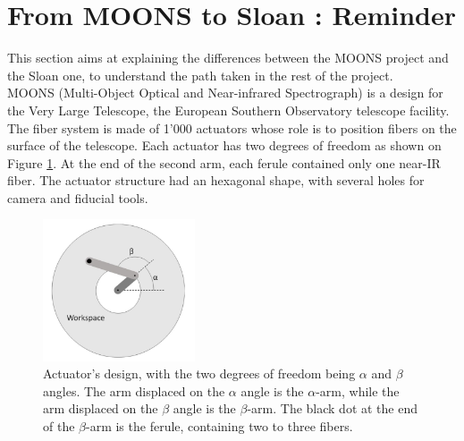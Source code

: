 \section{From MOONS to Sloan : Reminder} \label{reminder}

This section aims at explaining the differences between the MOONS project and the Sloan one, to understand the path taken in the rest of the project.
\\

MOONS (Multi-Object Optical and Near-infrared Spectrograph) is a design for the Very Large Telescope, the European Southern Observatory telescope facility. The fiber system is made of 1'000 actuators whose role is to position fibers on the surface of the telescope. Each actuator has two degrees of freedom as shown on Figure \ref{fig:reminder:actuator}. At the end of the second arm, each ferule contained only one near-IR fiber. The actuator structure had an hexagonal shape, with several holes for camera and fiducial tools.
\\

\begin{figure}[h]
\begin{center}
	\includegraphics[width=0.40\textwidth]{reminder/actuator.png}
	\caption{Actuator's design, with the two degrees of freedom being $\alpha$ and $\beta$ angles. The arm displaced on the $\alpha$ angle is the $\alpha$-arm, while the arm displaced on the $\beta$ angle is the $\beta$-arm. The black dot at the end of the $\beta$-arm is the ferule, containing two to three fibers.}
	\label{fig:reminder:actuator}
\end{center}
\end{figure}

